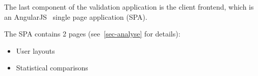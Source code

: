 The last component of the validation application is the client frontend, which is an AngularJS~\cite{AngularJS} single page application (SPA).

The SPA contains 2 pages (see~\ref{sec-analyse} for details):
\begin{itemize}
    \item User layouts
    \item Statistical comparisons
\end{itemize}






